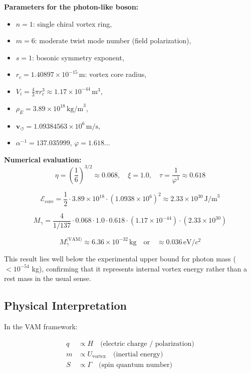 \noindent
\textbf{Parameters for the photon-like boson:}
\begin{itemize}
    \item \(n = 1\): single chiral vortex ring,
    \item \(m = 6\): moderate twist mode number (field polarization),
    \item \(s = 1\): bosonic symmetry exponent,
    \item \(r_c = 1.40897 \times 10^{-15} \, \text{m}\): vortex core radius,
    \item \(V_i = \frac{4}{3} \pi r_c^3 \approx 1.17 \times 10^{-44} \, \text{m}^3\),
    \item \(\rho_{\scriptscriptstyle\boldsymbol\!E}= 3.89 \times 10^{18} \, \text{kg/m}^3\),
    \item \(\mathbf{v}_{\scriptscriptstyle\boldsymbol{\circlearrowleft}} = 1.09384563 \times 10^6 \, \text{m/s}\),
    \item \(\alpha^{-1} = 137.035999\), \quad \(\varphi = 1.618...\)
\end{itemize}

\noindent
\textbf{Numerical evaluation:}
\[
\eta = \left( \frac{1}{6} \right)^{3/2} \approx 0.068,
\quad
\xi = 1.0,
\quad
\tau = \frac{1}{\varphi^1} \approx 0.618
\]

\[
\mathcal{E}_\text{core} = \frac{1}{2} \cdot 3.89 \times 10^{18} \cdot (1.0938 \times 10^6)^2 \approx 2.33 \times 10^{30} \, \text{J/m}^3
\]

\[
M_\gamma = \frac{4}{1/137} \cdot 0.068 \cdot 1.0 \cdot 0.618 \cdot (1.17 \times 10^{-44}) \cdot (2.33 \times 10^{30})
\]

\[
\boxed{
M_\gamma^\text{(VAM)} \approx 6.36 \times 10^{-32} \, \text{kg}
}
\quad \text{or} \quad
\boxed{
\approx 0.036 \, \text{eV}/c^2
}
\]

This result lies well below the experimental upper bound for photon mass (\(< 10^{-54}\) kg), confirming that it represents internal vortex energy rather than a rest mass in the usual sense.

\subsection{Physical Interpretation}

In the VAM framework:

\begin{align*}
q &\propto H \quad \text{(electric charge / polarization)} \\
m &\propto U_{\text{vortex}} \quad \text{(inertial energy)} \\
S &\propto \Gamma \quad \text{(spin quantum number)}
\end{align*}

